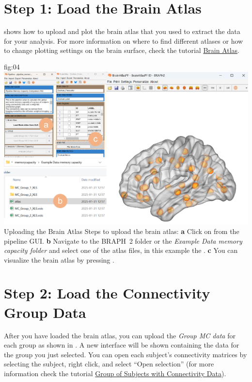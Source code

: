 \documentclass[justified]{tufte-handout}
\begin{document}
\clearpage
\section{Step 1: Load the Brain Atlas}


 shows how to upload and plot the brain atlas that you used to extract the data for your analysis. For more information on where to find different atlases or how to change plotting settings on the brain surface, check the tutorial \href{https://github.com/braph-software/BRAPH-2/tree/develop/tutorials/data/tut_ba}{Brain Atlas}.

{fig:04}
{
	\includegraphics{fig04.jpg}
}
{Uploading the Brain Atlas}
{
	Steps to upload the brain atlas:
	{\bf a} Click on  from the pipeline GUI.
	{\bf b} Navigate to the BRAPH~2 folder  or the \emph{Example Data memory capacity folder} and select one of the atlas files, in this example the . 
	{\bf c} You can visualize the brain atlas by pressing . 
}

\clearpage
\section{Step 2: Load the Connectivity Group Data}

After you have loaded the brain atlas, you can upload the \emph{Group MC data} for each group as shown in . A new interface will be shown containing the data for the group you just selected. You can open each subject’s connectivity matrices by selecting the subject, right click, and select “Open selection” (for more information check the tutorial \href{https://github.com/braph-software/BRAPH-2/tree/develop/tutorials/data/tut_gr_con}{Group of Subjects with Connectivity Data}).
\end{document}
